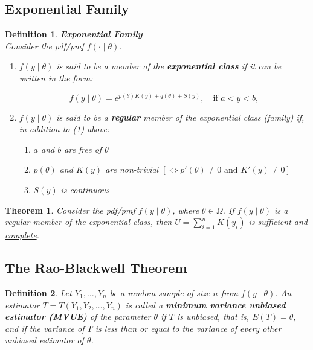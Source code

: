 \documentclass[a4paper,12pt]{article}
\theoremstyle{nonitalic}
\newtheorem{definition}{Definition}[subsection]
\newtheorem{theorem}{Theorem}[subsection]
\begin{document}
    \newpage

    \subsection{Exponential Family}

    \begin{definition} \textbf{Exponential Family}\\
        Consider the pdf/pmf \( f(\cdot \mid \theta) \).
        
        \begin{enumerate}
            \item \( f(y \mid \theta) \) is said to be a member of the \textbf{exponential class} if it can be written in the form:
        
            \[
            f(y \mid \theta) = e^{p(\theta)K(y) + q(\theta) + S(y)}, \quad \text{if } a < y < b,
            \]
            
            \item \( f(y \mid \theta) \) is said to be a \textbf{regular} member of the exponential class (family) if, in addition to (1) above:
            \begin{enumerate}
                \item \(a\) and \(b\) are free of \(\theta\)
                \item \(p(\theta)\) and \(K(y)\) are non-trivial \([\iff p'(\theta) \neq 0 \text{ and } K'(y) \neq 0]\)
                \item \(S(y)\) is continuous
            \end{enumerate}
        \end{enumerate}
        
        \end{definition}

        \begin{theorem}
            Consider the pdf/pmf \(f(y \mid \theta)\), where \(\theta \in \Omega\). If \(f(y \mid \theta)\) is a regular member of the exponential class, then \(U = \sum\limits_{i=1}^{n} K(y_i)\) is \underline{sufficient} and \underline{complete}.
        \end{theorem}

    \newpage

    \subsection{The Rao-Blackwell Theorem}

    \begin{definition}
        Let \( Y_1, \ldots, Y_n \) be a random sample of size \( n \) from \( f(y \mid \theta) \). An estimator \( T = T(Y_1, Y_2, \ldots, Y_n) \) is called a \textbf{minimum variance unbiased estimator (MVUE)} of the parameter \(\theta\) if \( T \) is unbiased, that is, \( E(T) = \theta \), and if the variance of \( T \) is less than or equal to the variance of every other unbiased estimator of \(\theta\).
    \end{definition}
\end{document}
